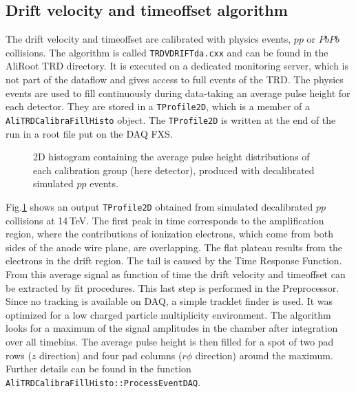 \documentclass{alicetdr}
\begin{document}
\subsection{Drift velocity and timeoffset algorithm}
The drift velocity and timeoffset are calibrated with physics events,
$pp$ or $PbPb$ collisions. The algorithm is called
{\tt TRDVDRIFTda.cxx} and can be found in the AliRoot TRD directory.
It is executed on a dedicated monitoring server, which is not part
of the dataflow and gives access to full events of the TRD. The
physics events are used to fill continuously during data-taking an
average pulse height for each detector. They are stored in a
{\tt TProfile2D}, which is a member of a { \tt AliTRDCalibraFillHisto}
object. The {\tt TProfile2D} is written at the end of the run in a
root file put on the DAQ FXS.\\
\begin{figure}[h]
  \centering\mbox{}
  \caption{\label{referenceph2d}2D histogram containing the average
pulse height distributions of each calibration group (here detector),
produced with decalibrated simulated $pp$ events.}
\end{figure}

Fig.\ref{referenceph2d} shows an output {\tt TProfile2D} obtained
from simulated decalibrated $pp$ collisions at 14\,TeV. The first
peak in time corresponds to the amplification region, where the
contributions of ionization electrons, which come from both sides
of the anode wire plane, are overlapping. The flat plateau results
from the electrons in the drift region. The tail is caused by the
Time Response Function. From this average signal as function of time
the drift velocity and timeoffset can be extracted by fit procedures.
This last step is performed in the Preprocessor.\\
Since no tracking is available on DAQ, a simple tracklet finder is
used. It was optimized for a low charged particle multiplicity
environment. The algorithm looks for a maximum of the signal
amplitudes in the chamber after integration over all timebins. The
average pulse height is then filled for a spot of two pad rows
($z$ direction) and four pad columns ($r\phi$ direction) around the
maximum. Further details can be found in the function
{\tt AliTRDCalibraFillHisto::ProcessEventDAQ}.
%
\end{document}
